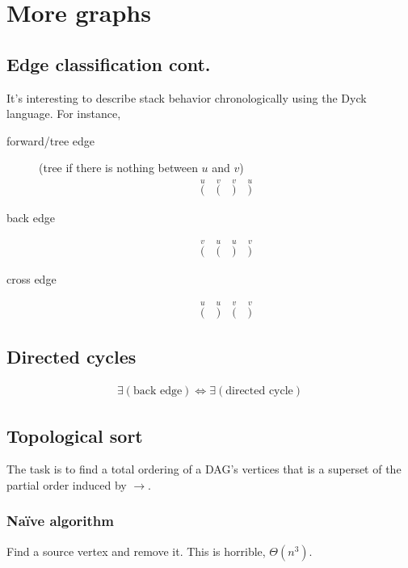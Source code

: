 \chapter{More graphs}
\section{Edge classification cont.}
It's interesting to describe stack behavior chronologically using the Dyck language. For instance,

\begin{description}
	\item[forward/tree edge] (tree if there is nothing between \(u\) and \(v\))
	\begin{align}
	\overset{{u}}{(}
	\quad
	\overset{{v}}{(}
	\quad
	\overset{{v}}{)}
	\quad
	\overset{{u}}{)}
	\end{align}
	
	\item[back edge]
	\begin{align}
	\overset{{v}}{(}
	\quad
	\overset{{u}}{(}
	\quad
	\overset{{u}}{)}
	\quad
	\overset{{v}}{)}
	\end{align}
	
	\item [cross edge]
	\begin{align}
	\overset{{u}}{(}
	\quad
	\overset{{u}}{)}
	\quad
	\overset{{v}}{(}
	\quad
	\overset{{v}}{)}
	\end{align}
\end{description}

\section{Directed cycles}
\begin{align}
	\exists(\text{back edge}) \iff \exists(\text{directed cycle})
\end{align}

\section{Topological sort}
The task is to find a total ordering of a DAG's vertices that is a superset of the partial order induced by \(\rightarrow\).

\subsection{Na\"ive algorithm}
Find a source vertex and remove it. This is horrible, \(\Theta\left(n^3\right)\).


